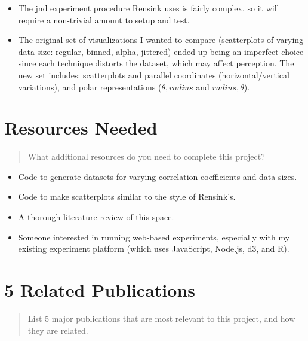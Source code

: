 \documentclass{proc}
\begin{document}
\begin{itemize}
\item The jnd experiment procedure Rensink uses is fairly complex, so it will require a non-trivial amount to setup and test.
\item The original set of visualizations I wanted to compare (scatterplots of varying data size: regular, binned, alpha, jittered) ended up being an imperfect choice since each technique distorts the dataset, which may affect perception. The new set includes: scatterplots and parallel coordinates (horizontal/vertical variations), and polar representations ($\theta, radius$ and $radius, \theta$).
\end{itemize}


\section{Resources Needed}
\begin{quote}
What additional resources do you need to complete this project?
\end{quote}

\begin{itemize}
\item Code to generate datasets for varying correlation-coefficients and data-sizes.
\item Code to make scatterplots similar to the style of Rensink's.
\item A thorough literature review of this space.
\item Someone interested in running web-based experiments, especially with my existing experiment platform (which uses JavaScript, Node.js, d3, and R).
\end{itemize}

\section{5 Related Publications}
\begin{quote}
  List 5 major publications that are most relevant to this project, and how they are related.
\end{quote}

\end{document}

